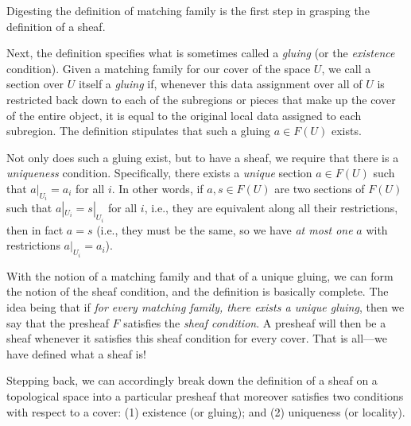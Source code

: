 \documentclass[11pt]{book}
\theoremstyle{definition}
\theoremstyle{definition}
\theoremstyle{definition}
\theoremstyle{theorem}
\theoremstyle{definition}
\begin{document}
			Digesting the definition of matching family is the first step in grasping the definition of a sheaf. \par 
			Next, the definition specifies what is sometimes called a \textit{gluing} (or the \textit{existence} condition). Given a matching family for our cover of the space $U$, we call a section over $U$ itself a \textit{gluing} if, whenever this data assignment over all of $U$ is restricted back down to each of the subregions or pieces that make up the cover of the entire object, it is equal to the original local data assigned to each subregion. The definition stipulates that such a gluing $a \in F(U)$ exists.\par 
			Not only does such a gluing exist, but to have a sheaf, we require that there is a \textit{uniqueness} condition. Specifically, there exists a \textit{unique} section $a \in F(U)$ such that $a|_{U_i} = a_i$ for all $i$. In other words, if $a, s \in F(U)$ are two sections of $F(U)$ such that $a|_{U_i} = s|_{U_i}$ for all $i$, i.e., they are equivalent along all their restrictions, then in fact $a = s$ (i.e., they must be the same, so we have \textit{at most one} $a$ with restrictions $a|_{U_i} = a_i$). \par 
			With the notion of a matching family and that of a unique gluing, we can form the notion of the sheaf condition, and the definition is basically complete. The idea being that if \textit{for every matching family, there exists a unique gluing}, then we say that the presheaf $F$ satisfies the \textit{sheaf condition}. A presheaf will then be a sheaf whenever it satisfies this sheaf condition for every cover. That is all---we have defined what a sheaf is! \par 
	Stepping back, we can accordingly break down the definition of a sheaf on a topological space into a particular presheaf that moreover satisfies two conditions with respect to a cover: (1) existence (or gluing); and (2) uniqueness (or locality). 
\end{document}
